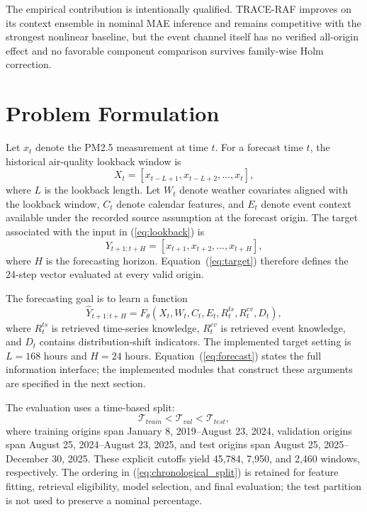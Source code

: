 \documentclass{ieeeaccess}
\begin{document}
The empirical contribution is intentionally qualified. TRACE-RAF improves on
its context ensemble in nominal MAE inference and remains competitive with the
strongest nonlinear baseline, but the event channel itself has no verified
all-origin effect and no favorable component comparison survives family-wise
Holm correction.
\section{Problem Formulation}

Let $x_t$ denote the PM2.5 measurement at time $t$. For a forecast time $t$, the historical air-quality lookback window is
\begin{equation}
    X_t = [x_{t-L+1}, x_{t-L+2}, \ldots, x_t],
    \label{eq:lookback}
\end{equation}
where $L$ is the lookback length. Let $W_t$ denote weather covariates aligned
with the lookback window, $C_t$ denote calendar features, and $E_t$ denote event
context available under the recorded source assumption at the forecast origin.
The target associated with the input in (\ref{eq:lookback}) is
\begin{equation}
    Y_{t+1:t+H} = [x_{t+1}, x_{t+2}, \ldots, x_{t+H}],
    \label{eq:target}
\end{equation}
where $H$ is the forecasting horizon.
Equation~(\ref{eq:target}) therefore defines the 24-step vector evaluated at
every valid origin.

The forecasting goal is to learn a function
\begin{equation}
    \hat{Y}_{t+1:t+H} =
    F_{\theta}(X_t, W_t, C_t, E_t, R^{ts}_t, R^{ev}_t, D_t),
    \label{eq:forecast}
\end{equation}
where $R^{ts}_t$ is retrieved time-series knowledge, $R^{ev}_t$ is retrieved event knowledge, and $D_t$ contains distribution-shift indicators. The implemented target setting is $L=168$ hours and $H=24$ hours.
Equation~(\ref{eq:forecast}) states the full information interface; the
implemented modules that construct these arguments are specified in the next
section.

The evaluation uses a time-based split:
\begin{equation}
    \mathcal{T}_{train} < \mathcal{T}_{val} < \mathcal{T}_{test},
    \label{eq:chronological_split}
\end{equation}
where training origins span January 8, 2019--August 23, 2024, validation
origins span August 25, 2024--August 23, 2025, and test origins span August 25,
2025--December 30, 2025. These explicit cutoffs yield 45,784, 7,950, and 2,460
windows, respectively. The ordering in (\ref{eq:chronological_split}) is
retained for feature fitting, retrieval eligibility, model selection, and final
evaluation; the test partition is not used to preserve a nominal percentage.
\end{document}
